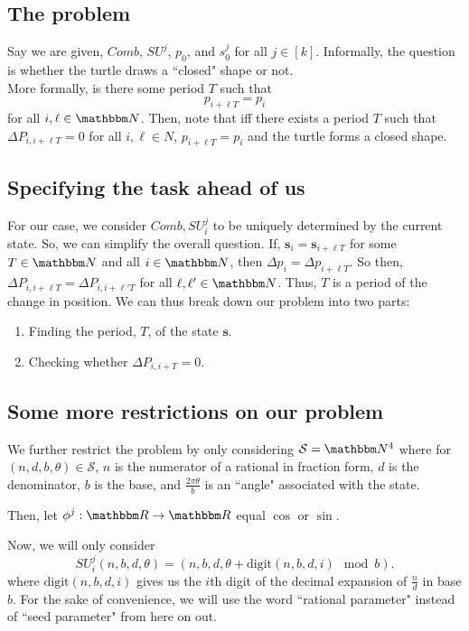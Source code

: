 \documentclass[11pt,titlepage]{article}
\newcommand{\sinOrCos}{\phi^j}
\begin{document}
\subsection{The problem}
Say we are given, $Comb$, $SU^j$, $p_0$, and $s^j_0$ for all $j \in [k]$.
Informally, the question is whether the turtle draws a ``closed" shape or not.\\
More formally, is there some period $T$ such that 
$$
  p_{i + \ell T} = p_{i}
$$
for all $i, \ell \in \N$.
Then, note that iff there exists a period $T$ such that 
$\Delta P_{i, i + \ell T} = 0$ for all $i, \ell \in N$, 
$p_{i + \ell T} = p_{i}$ and the turtle forms a closed shape.

\subsection{Specifying the task ahead of us}
For our case, we consider $Comb, SU_i^j$ to be uniquely determined by the current state.
So, we can simplify the overall question.
If, $\pmb{s}_i = \pmb{s}_{i + \ell T}$ for some $T \in \N$ and all $i \in \N$, then 
$\Delta p_{i} = \Delta p_{i + \ell T}$. So then,
$\Delta P_{i, i + \ell T} = \Delta P_{i, i + \ell' T}$ for all $\ell, \ell' \in \N$.
Thus, $T$ is a period of the change in position. We can thus
break down our problem into two parts:
\begin{enumerate}
  \item Finding the period, $T$, of the state $\pmb{s}$.
  \item Checking whether $\Delta P_{i, i + T} = 0$.
\end{enumerate}

\subsection{Some more restrictions on our problem}
We further restrict the problem by only considering $\mathcal{S} = \N^4$ where for $(n, d, b, \theta) \in \mathcal{S}$,
$n$ is the numerator of a rational in fraction form, $d$ is the denominator, 
$b$ is the base,
and $\frac{2 \pi \theta}{b}$ is an ``angle" associated with the state.

Then, let $\sinOrCos: \R \rightarrow \R$ equal $\cos$ or $\sin$. 

Now, we will only consider
$$
  SU_i^j(n, b, d, \theta) = (n, b, d, \theta + \mathrm{digit}(n, b, d, i) \mod b).
$$
where $\mathrm{digit}(n, b, d, i)$ gives us the $i$th digit of the decimal expansion of $\frac{n}{d}$
in base $b$. For the sake of convenience, we will use the word ``rational parameter" 
instead of ``seed parameter" from here on out.
\end{document}
